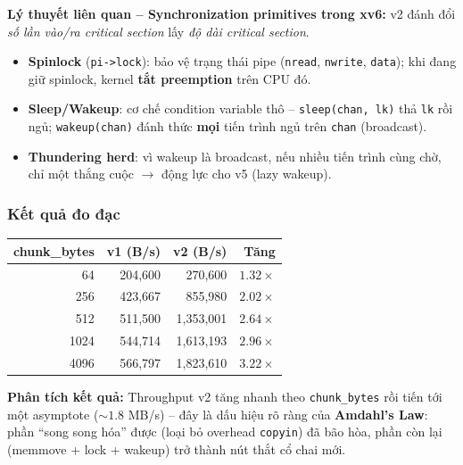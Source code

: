 \documentclass[11pt,a4paper]{article}
\begin{document}
\begin{callout}
\textbf{Lý thuyết liên quan -- Synchronization primitives trong xv6:} v2 đánh đổi \emph{số lần vào/ra critical section} lấy \emph{độ dài critical section}.
\begin{itemize}
  \item \textbf{Spinlock} (\texttt{pi->lock}): bảo vệ trạng thái pipe (\texttt{nread}, \texttt{nwrite}, \texttt{data}); khi đang giữ spinlock, kernel \textbf{tắt preemption} trên CPU đó.
  \item \textbf{Sleep/Wakeup}: cơ chế condition variable thô -- \texttt{sleep(chan, lk)} thả \texttt{lk} rồi ngủ; \texttt{wakeup(chan)} đánh thức \textbf{mọi} tiến trình ngủ trên \texttt{chan} (broadcast).
  \item \textbf{Thundering herd}: vì wakeup là broadcast, nếu nhiều tiến trình cùng chờ, chỉ một thắng cuộc $\rightarrow$ động lực cho v5 (lazy wakeup).
\end{itemize}
\end{callout}

\subsubsection{Kết quả đo đạc}

\begin{center}
\begin{tabular}{rrrr}
\toprule
\textbf{chunk\_bytes} & \textbf{v1 (B/s)} & \textbf{v2 (B/s)} & \textbf{Tăng} \\
\midrule
64    & 204{,}600 & 270{,}600     & $1.32\times$ \\
256   & 423{,}667 & 855{,}980     & $2.02\times$ \\
512   & 511{,}500 & 1{,}353{,}001 & $2.64\times$ \\
1024  & 544{,}714 & 1{,}613{,}193 & $2.96\times$ \\
4096  & 566{,}797 & 1{,}823{,}610 & $3.22\times$ \\
\bottomrule
\end{tabular}
\end{center}

\textbf{Phân tích kết quả:} Throughput v2 tăng nhanh theo \texttt{chunk\_bytes} rồi tiến tới một asymptote ($\sim 1.8$ MB/s) -- đây là dấu hiệu rõ ràng của \textbf{Amdahl's Law}: phần ``song song hóa'' được (loại bỏ overhead \texttt{copyin}) đã bão hòa, phần còn lại (memmove + lock + wakeup) trở thành nút thắt cổ chai mới.

\end{document}
